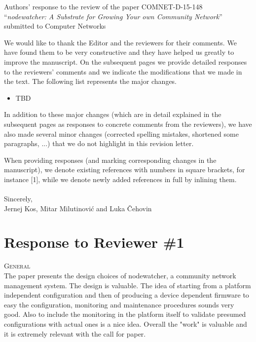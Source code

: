 \documentclass[12pt,twoside,a4paper]{report}
\newcommand{\nodewatcher}{\textit{nodewatcher}}
\begin{document}
\pagestyle{empty}
\begin{center} {\Large{Authors' response to the review of the paper COMNET-D-15-148}}\\
    ``\emph{\nodewatcher{}: A Substrate for Growing Your own Community Network}''\\
    submitted to Computer Networks
\end{center}

\noindent We would like to thank the Editor and the reviewers for their comments. We have found them to be very constructive and they have helped us greatly to improve the manuscript. On the subsequent pages we provide detailed responses to the reviewers' comments and we indicate the modifications that we made in the text. The following list represents the major changes.
\begin{itemize}
\item TBD
\end{itemize}

\noindent In addition to these major changes (which are in detail explained in the subsequent pages as responses to concrete comments from the reviewers), we have also made several minor changes (corrected spelling mistakes, shortened some paragraphs, ...) that we do not highlight in this revision letter.

\noindent When providing responses (and marking corresponding changes in the manuscript), we denote existing references with numbers in square brackets, for instance [1], while we denote newly added references in full by inlining them.\\
\\
\noindent Sincerely,\\
Jernej Kos, Mitar Milutinović and Luka Čehovin

\newpage

\section*{Response to Reviewer \#1}

\vspace{0.5cm}\noindent\textsc{General}\\
\noindent The paper presents  the design choices of nodewatcher, a community network management system. The design is valuable. The idea of starting from a platform independent configuration and then of producing a device dependent firmware to easy the configuration, monitoring and maintenance procedures sounds very good. Also to include the monitoring in the platform itself to validate presumed configurations with actual ones is a nice idea.
Overall the "work" is valuable and it is extremely relevant with the call for paper.
\end{document}
